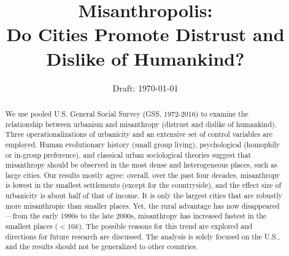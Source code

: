 \documentclass[11pt, letterpaper]{article}
\date{Draft: {}\today}
\title{  %
  Misanthropolis:\\ Do Cities Promote Distrust and Dislike of Humankind?
%
}
\author{
}
\begin{document}


\maketitle
\vspace{-.4in}
\begin{center}

\end{center}


\begin{abstract}
\noindent 
We use pooled U.S. General Social Survey (GSS, 1972-2016)  to examine 
the relationship between urbanism and misanthropy (distrust and dislike of humankind). Three operationalizations of urbanicity and an extensive set of control variables are employed. 
Human evolutionary history (small group living),  psychological
(homophily or in-group preference), and classical urban sociological theories  
suggest that misanthropy should be observed in the most dense and
heterogeneous places, such as large cities. Our results mostly agree: overall, over
the past four decades, misanthropy is lowest in the smallest settlements (except for the countryside), and the effect size of urbanicity is about half of that of
 income. It is only the largest cities that are robustly more misanthropic than smaller places.
Yet, the rural advantage has now disappeared---from the early 1990s to the late 2000s, misanthropy has
increased fastest in the smallest places ($<10k$). The possible reasons for this trend are explored and directions for future research are discussed. The analysis is solely focused on the U.S., and the results should not be generalized to other countries.
\end{abstract}

\end{document}
